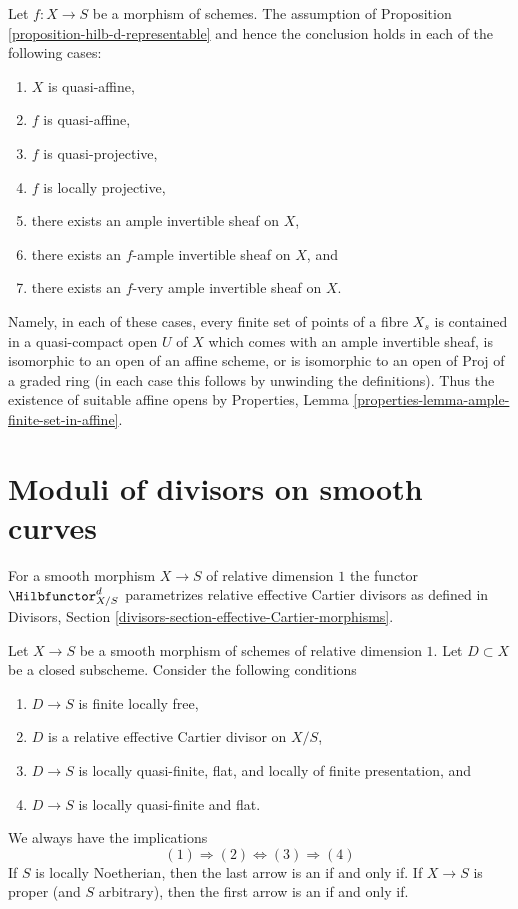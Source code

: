 \begin{remark}
\label{remark-when-proposition-applies}
Let $f : X \to S$ be a morphism of schemes. The assumption of
Proposition \ref{proposition-hilb-d-representable} and
hence the conclusion holds in each of the following cases:
\begin{enumerate}
\item $X$ is quasi-affine,
\item $f$ is quasi-affine,
\item $f$ is quasi-projective,
\item $f$ is locally projective,
\item there exists an ample invertible sheaf on $X$,
\item there exists an $f$-ample invertible sheaf on $X$, and
\item there exists an $f$-very ample invertible sheaf on $X$.
\end{enumerate}
Namely, in each of these cases, every finite set of points of
a fibre $X_s$ is contained in a quasi-compact open $U$ of $X$
which comes with an ample invertible sheaf, is isomorphic
to an open of an affine scheme, or is isomorphic to an open
of $\text{Proj}$ of a graded ring (in each case this follows
by unwinding the definitions). Thus the existence of suitable
affine opens by
Properties, Lemma \ref{properties-lemma-ample-finite-set-in-affine}.
\end{remark}




\section{Moduli of divisors on smooth curves}
\label{section-divisors}

\noindent
For a smooth morphism $X \to S$ of relative dimension $1$ the functor
$\Hilbfunctor^d_{X/S}$ parametrizes relative effective Cartier divisors
as defined in
Divisors, Section \ref{divisors-section-effective-Cartier-morphisms}.

\begin{lemma}
\label{lemma-divisors-on-curves}
Let $X \to S$ be a smooth morphism of schemes of relative dimension $1$.
Let $D \subset X$ be a closed subscheme. Consider the following conditions
\begin{enumerate}
\item $D \to S$ is finite locally free,
\item $D$ is a relative effective Cartier divisor on $X/S$,
\item $D \to S$ is locally quasi-finite, flat, and
locally of finite presentation, and
\item $D \to S$ is locally quasi-finite and flat.
\end{enumerate}
We always have the implications
$$
(1) \Rightarrow (2) \Leftrightarrow (3) \Rightarrow (4)
$$
If $S$ is locally Noetherian, then the last arrow is an if and only if.
If $X \to S$ is proper (and $S$ arbitrary), then the first arrow is
an if and only if.
\end{lemma}

